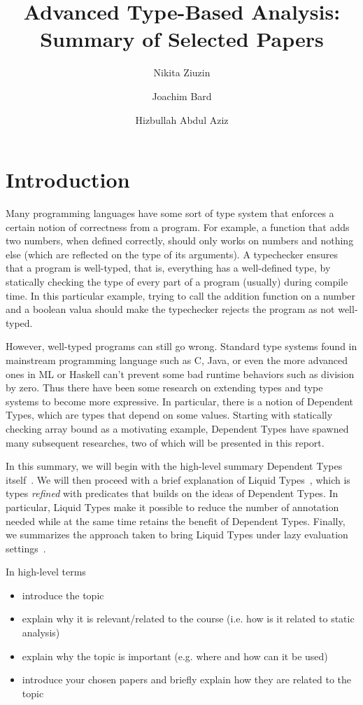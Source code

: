 \documentclass[a4paper,UKenglish]{lipics-v2016}
\title{Advanced Type-Based Analysis: Summary of Selected Papers}
\author[1]{Nikita Ziuzin}
\author[2]{Joachim Bard}
\author[3]{Hizbullah Abdul Aziz}
\affil[1]{\texttt{nzyuzin93@gmail.com}}
\affil[2]{\texttt{s9jobard@stud.uni-saarland.de}}
\affil[3]{\texttt{s8hijabb@stud.uni-saarland.de}}
\begin{document}
\maketitle


\section{Introduction}
  
  Many programming languages have some sort of type system that enforces a
  certain notion of correctness from a program.  For example, a function that
  adds two numbers, when defined correctly, should only works on numbers and
  nothing else (which are reflected on the type of its arguments).  A
  typechecker ensures that a program is well-typed, that is, everything has a
  well-defined type, by statically checking the type of every part of a program
  (usually) during compile time.  In this particular example, trying to call
  the addition function on a number and a boolean valua should make the
  typechecker rejects the program as not well-typed.  

  However, well-typed programs can still go wrong.  Standard type systems found
  in mainstream programming language such as C, Java, or even the more advanced
  ones in ML or Haskell can't prevent some bad runtime behaviors such as
  division by zero.  Thus there have been some research on extending types and
  type systems to become more expressive.  In particular, there is a notion of
  Dependent Types, which are types that depend on some values.  Starting with
  statically checking array bound as a motivating example, Dependent Types
  have spawned many subsequent researches, two of which will be presented in
  this report.

  In this summary, we will begin with the high-level summary Dependent Types
  itself~\cite{Xi:1998:EAB}.  We will then proceed with a brief explanation of
  Liquid Types~\cite{Rondon:2008:LT}, which is types \emph{refined} with
  predicates that builds on the ideas of Dependent Types.  In particular,
  Liquid Types make it possible to reduce the number of annotation needed while
  at the same time retains the benefit of Dependent Types.  Finally, we
  summarizes the approach taken to bring Liquid Types under lazy evaluation
  settings~\cite{Vazou:ICFP:2014}.

  In high-level terms
  \begin{itemize}
    \item introduce the topic

    \item explain why it is relevant/related to the course (i.e. how is it related
    to static analysis)

    \item explain why the topic is important (e.g. where and how can it be used)

    \item introduce your chosen papers and briefly explain how they are related
    to the topic
  \end{itemize}
\end{document}
